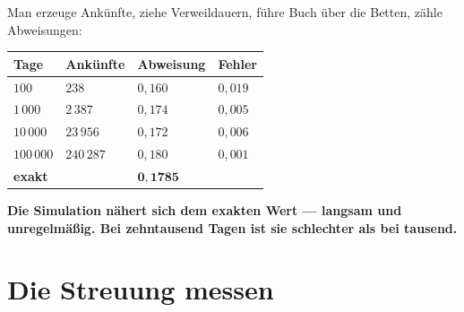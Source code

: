 \begin{merksatz}
Man erzeuge Ankünfte, ziehe Verweildauern, führe Buch über die Betten, zähle Abweisungen:

\begin{center}
{\small
\renewcommand{\arraystretch}{1.48}
\begin{tabular}{@{}P{2.0cm}P{2.2cm}P{2.4cm}P{1.8cm}@{}}
\toprule
\textbf{Tage} & \textbf{Ankünfte} & \textbf{Abweisung} & \textbf{Fehler}\\
\midrule
$100$ & $238$ & $0{,}160$ & $0{,}019$\\
$1\,000$ & $2\,387$ & $0{,}174$ & $0{,}005$\\
$10\,000$ & $23\,956$ & $0{,}172$ & $0{,}006$\\
$100\,000$ & $240\,287$ & $0{,}180$ & $0{,}001$\\
\midrule
\textbf{exakt} & & $\mathbf{0{,}1785}$ & \\
\bottomrule
\end{tabular}}
\end{center}

\begin{center}
\begin{minipage}{0.9\textwidth}
\textbf{Die Simulation nähert sich dem exakten Wert --- langsam und unregelmäßig. Bei zehntausend Tagen ist sie schlechter als bei tausend.}
\end{minipage}
\end{center}

\begin{center}
\begin{minipage}{0.88\textwidth}
\end{minipage}
\end{center}
\end{merksatz}

\section{Die Streuung messen}


